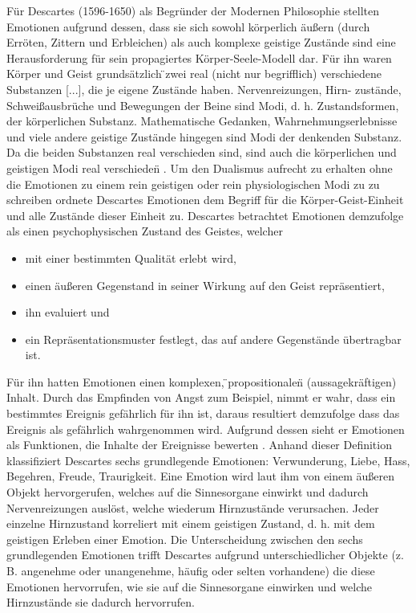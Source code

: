 Für Descartes (1596-1650) als Begründer der Modernen Philosophie stellten Emotionen aufgrund dessen, dass sie sich sowohl körperlich äußern (durch Erröten, Zittern und Erbleichen) als auch komplexe geistige Zustände sind \cite{perler_rene_2006}  eine Herausforderung für sein propagiertes Körper-Seele-Modell dar. Für ihn waren Körper und Geist grundsätzlich \"{}zwei  real  (nicht  nur  begrifflich)   verschiedene Substanzen [...], die je eigene Zustände haben. Nervenreizungen, Hirn-
zustände,  Schweißausbrüche  und  Bewegungen  der  Beine  sind  Modi,  
d.  h.  Zustandsformen,  der  körperlichen  Substanz. Mathematische  Gedanken, Wahrnehmungserlebnisse  und  viele  andere  geistige  Zustände hingegen sind Modi der denkenden Substanz. Da die beiden Substanzen real  verschieden  sind,  sind  auch  die  körperlichen  und  geistigen  Modi  real  verschieden\"{} \cite{perler_descartes:_2008}.
Um den Dualismus aufrecht zu erhalten ohne die Emotionen zu einem rein geistigen oder rein physiologischen Modi zu zu schreiben ordnete Descartes Emotionen dem Begriff für die Körper-Geist-Einheit und alle Zustände dieser Einheit zu.
Descartes betrachtet Emotionen demzufolge als einen psychophysischen Zustand des Geistes, welcher
\begin{itemize}
\item  mit  einer  bestimmten  Qualität  erlebt  wird,
\item einen äußeren Gegenstand in seiner Wirkung auf den Geist repräsentiert,
\item ihn  evaluiert  und
\item  ein  Repräsentationsmuster  festlegt,  das  auf  andere  
Gegenstände übertragbar ist.
\end{itemize}
Für ihn hatten Emotionen einen komplexen, \"{}propositionalen\"{} (aussagekräftigen) Inhalt. Durch das Empfinden von Angst zum Beispiel, nimmt er wahr, dass ein bestimmtes Ereignis gefährlich für ihn ist, daraus resultiert demzufolge dass das Ereignis als gefährlich wahrgenommen wird. Aufgrund dessen sieht er Emotionen als Funktionen, die Inhalte der Ereignisse bewerten \cite{amy_m._schmitter_17th_2016}. 
Anhand dieser Definition klassifiziert Descartes sechs grundlegende Emotionen: Verwunderung,  Liebe,  Hass,  Begehren,  Freude,  Traurigkeit. Eine Emotion wird laut ihm von einem äußeren Objekt hervorgerufen, welches auf die Sinnesorgane einwirkt und dadurch Nervenreizungen auslöst, welche wiederum Hirnzustände verursachen. Jeder einzelne Hirnzustand  korreliert  mit  einem  geistigen  Zustand,  d.  h.  mit  dem  geistigen Erleben einer Emotion. Die Unterscheidung zwischen den sechs grundlegenden Emotionen trifft Descartes aufgrund unterschiedlicher  Objekte 
(z.  B.  angenehme  oder  unangenehme,  häufig  oder  selten  vorhandene) die diese Emotionen hervorrufen, wie sie auf die  Sinnesorgane  einwirken und welche Hirnzustände sie dadurch hervorrufen. \cite{perler_descartes:_2008}\\


